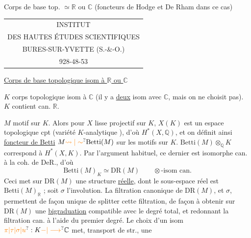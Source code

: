 Corps de base top. $\simeq\mathbb R$ ou $\mathbb C$ (foncteurs de Hodge et De Rham dans ce cas)

\begin{tabular}{c}
INSTITUT\\
DES HAUTES ÉTUDES SCIENTIFIQUES\\
BURES-SUR-YVETTE (S.-\&-O.)\\
928-48-53
\end{tabular}

\uline{Corps de base topologique isom à $\mathbb R$ ou $\mathbb C$}

$K$ corps topologique isom à $\mathbb C$ (il y a  \uline{deux} isom avec $\mathbb C$, mais on ne choisit pas). $K$ contient can. $\mathbb R$.

$M$ motif sur $K$. Alors  pour  $X$ lisse projectif sur $K$, $X(K)$ est un espace topologique cpt (variété $K$-analytique ), d'où $H^{*}(X,\mathbb Q)$, et on définit ainsi \uline{foncteur de Betti} $M\unsure{\rightsquigarrow|\sim}\mathrm{Betti}(M)$ sur les motifs sur $K$. $\mathrm{Betti}(M)\otimes_{\mathbb Q}K$  correspond à $H^*(X,K)$. Par l'argument habituel, ce dernier est isomorphe can. à la coh. de DeR., d'où
\[
 \mathrm{Betti}(M)_K\simeq\mathrm{DR}(M)\qquad \otimes\text{-isom can.}
\]
Ceci met sur  $\mathrm{DR}(M)$ une structure \uline{réelle}, dont le sous-espace réel est $\mathrm{Betti}(M)_{\mathbb R}$ ; soit $\sigma$ l'involution. La filtration canonique de $\mathrm{DR}(M)$, et $\sigma$, permettent de façon unique de splitter cette filtration, de façon à obtenir sur $\mathrm{DR}(M)$ une \uline{bigraduation} compatible avec le degré total, et redonnant la filtration can. à l'aide du premier degré. Le choix d'un isom $\unsure{\pi|\tau|\sigma|u}:K\unsure{\mathord{-}|\longrightarrow}\mathbb C$ met,  transport de str., une

